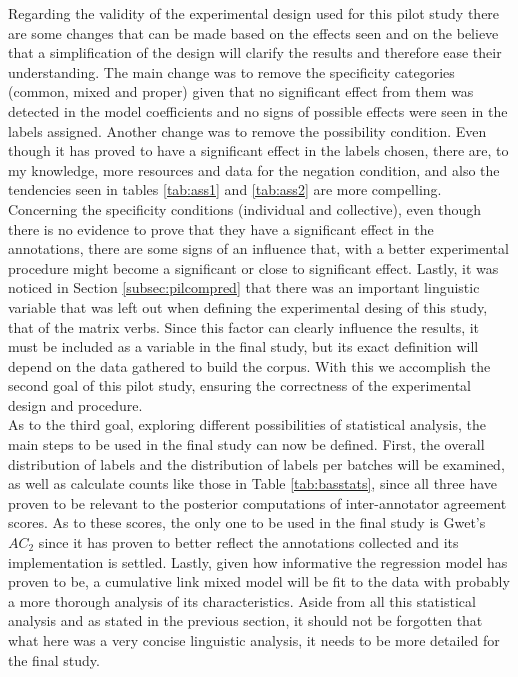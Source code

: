 Regarding the validity of the experimental design used for this pilot study there are some changes that can be made based on the effects seen and on the believe that a simplification of the design will clarify the results and therefore ease their understanding. The main change was to remove the specificity categories (common, mixed and proper) given that no significant effect from them was detected in the model coefficients and no signs of possible effects were seen in the labels assigned. Another change was to remove the possibility condition. Even though it has proved to have a significant effect in the labels chosen, there are, to my knowledge, more resources and data for the negation condition, and also the tendencies seen in tables \ref{tab:ass1} and \ref{tab:ass2} are more compelling. Concerning the specificity conditions (individual and collective), even though there is no evidence to prove that they have a significant effect in the annotations, there are some signs of an influence that, with a better experimental procedure might become a significant or close to significant effect. Lastly, it was noticed in Section \ref{subsec:pilcompred} that there was an important linguistic variable that was left out when defining the experimental desing of this study, that of the matrix verbs. Since this factor can clearly influence the results, it must be included as a variable in the final study, but its exact definition will depend on the data gathered to build the corpus. With this we accomplish the second goal of this pilot study, ensuring the correctness of the experimental design and procedure.\\

As to the third goal, exploring different possibilities of statistical analysis, the main steps to be used in the final study can now be defined. First, the overall distribution of labels and the distribution of labels per batches will be examined, as well as calculate counts like those in Table \ref{tab:basstats}, since all three have proven to be relevant to the posterior computations of inter-annotator agreement scores. As to these scores, the only one to be used in the final study is Gwet's $AC_2$ since it has proven to better reflect the annotations collected and its implementation is settled. Lastly, given how informative the regression model has proven to be, a cumulative link mixed model will be fit to the data with probably a more thorough analysis of its characteristics. Aside from all this statistical analysis and as stated in the previous section, it should not be forgotten that what here was a very concise linguistic analysis, it needs to be more detailed for the final study.\\  

